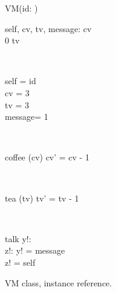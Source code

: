 \begin{figure}[H]
\centering
\begin{class}{VM(id: \integer)}
\\
\begin{state}
self, cv, tv, message: \integer
{} \leq  cv 
\\
0 \leq  tv 
\end{state} 
\\
\begin{init}
self = id
\\cv = 3
\\tv = 3
\\ message= 1
\end{init} 
\\
\begin{op}{coffee}
\Delta (cv)
\ST
cv' = cv - 1
\end{op}
\\
\begin{op}{tea}
\Delta (tv)
\ST
tv' = tv - 1
\end{op}
\\
\begin{op}{talk}
y!: \integer
\\z!: \integer
\ST
y! = message
\\z! = self
\end{op}
\end{class}
\caption{VM class, instance reference.}
\label{oz_vm_reference_name}
\end{figure}